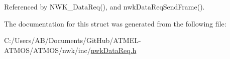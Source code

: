 Referenced by N\-W\-K\-\_\-\-Data\-Req(), and nwk\-Data\-Req\-Send\-Frame().



The documentation for this struct was generated from the following file\-:\begin{DoxyCompactItemize}
\item 
C\-:/\-Users/\-A\-B/\-Documents/\-Git\-Hub/\-A\-T\-M\-E\-L-\/\-A\-T\-M\-O\-S/\-A\-T\-M\-O\-S/nwk/inc/\hyperlink{nwk_data_req_8h}{nwk\-Data\-Req.\-h}\end{DoxyCompactItemize}
